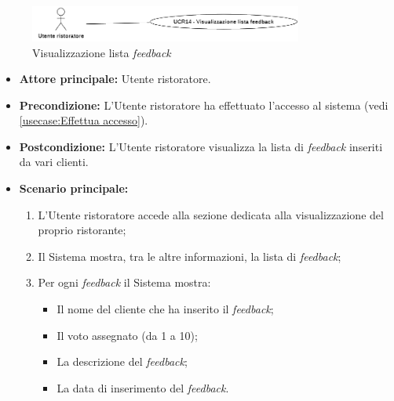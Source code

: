 \newpage
{}
\label{usecase:Visualizzazione lista feedback}

\begin{figure}[h]
	\centering
	\includegraphics[width=0.8\textwidth]{./uml/UCR14.png} 
	\caption{Visualizzazione lista \textit{feedback}}
	\label{fig:UCR14}
\end{figure}

\begin{itemize}
	\item \textbf{Attore principale:} Utente ristoratore.

	\item \textbf{Precondizione:} L'Utente ristoratore ha effettuato l'accesso al sistema (vedi \autoref{usecase:Effettua accesso}).

	\item \textbf{Postcondizione:} L'Utente ristoratore visualizza la lista di \textit{feedback} inseriti da vari clienti.


	\item \textbf{Scenario principale:}
	      \begin{enumerate}
		      \item L'Utente ristoratore accede alla sezione dedicata alla 
				  visualizzazione del proprio ristorante;

		      \item Il Sistema mostra, tra le altre informazioni, la lista di \textit{feedback};

			  \item Per ogni \textit{feedback} il Sistema mostra:
				  \begin{itemize}
					  \item Il nome del cliente che ha inserito il \textit{feedback};
					  \item Il voto assegnato (da 1 a 10);
					  \item La descrizione del \textit{feedback};
					  \item La data di inserimento del \textit{feedback}.
				  \end{itemize}
	      \end{enumerate}
\end{itemize}
